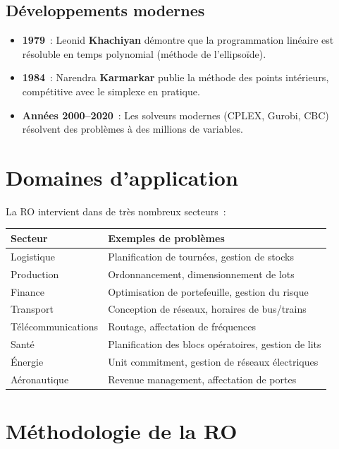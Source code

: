 \subsection{D\'eveloppements modernes}

\begin{itemize}
  \item \textbf{1979}~: Leonid \textbf{Khachiyan} d\'emontre que la
        programmation lin\'eaire est r\'esoluble en temps polynomial (m\'ethode de
        l'ellipso\"ide).
  \item \textbf{1984}~: Narendra \textbf{Karmarkar} publie la m\'ethode des
        points int\'erieurs, comp\'etitive avec le simplexe en pratique.
  \item \textbf{Ann\'ees 2000--2020}~: Les solveurs modernes (CPLEX, Gurobi,
        CBC) r\'esolvent des probl\`emes \`a des millions de variables.
\end{itemize}

\section{Domaines d'application}

La RO intervient dans de tr\`es nombreux secteurs~:

\begin{center}
\renewcommand{\arraystretch}{1.2}
\begin{tabular}{ll}
  \toprule
  \textbf{Secteur} & \textbf{Exemples de probl\`emes} \\
  \midrule
  Logistique & Planification de tourn\'ees, gestion de stocks \\
  Production & Ordonnancement, dimensionnement de lots \\
  Finance & Optimisation de portefeuille, gestion du risque \\
  Transport & Conception de r\'eseaux, horaires de bus/trains \\
  T\'el\'ecommunications & Routage, affectation de fr\'equences \\
  Sant\'e & Planification des blocs op\'eratoires, gestion de lits \\
  \'Energie & Unit commitment, gestion de r\'eseaux \'electriques \\
  A\'eronautique & Revenue management, affectation de portes \\
  \bottomrule
\end{tabular}
\end{center}

\section{M\'ethodologie de la RO}

